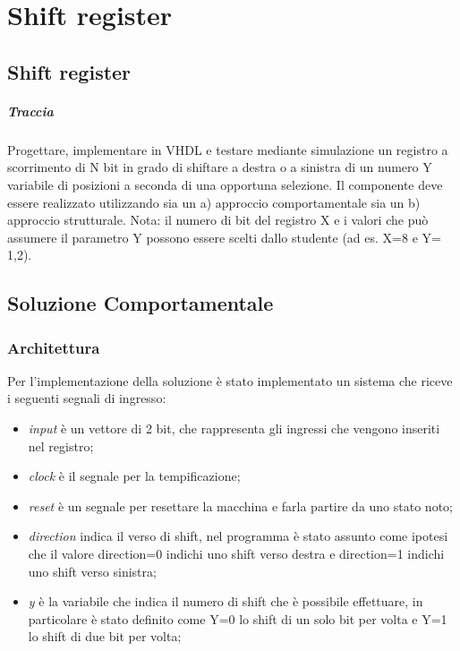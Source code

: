\chapter{Shift register}

\section{Shift register}
\paragraph{Traccia}
Progettare, implementare in VHDL e testare mediante simulazione un registro a scorrimento di N bit in grado di shiftare a destra o a sinistra di un numero Y variabile di posizioni a seconda di una opportuna selezione. Il componente deve essere realizzato utilizzando sia un a) approccio comportamentale sia un b) approccio strutturale.  
Nota: il numero di bit del registro X e i valori che può assumere il parametro Y possono essere scelti dallo studente (ad es. X=8 e Y= {1,2}).

\section{Soluzione Comportamentale}
\subsection{Architettura}
Per l'implementazione della soluzione è stato implementato un sistema che riceve i seguenti segnali di ingresso:
\begin{itemize}
\item \textit{input} è un vettore di 2 bit, che rappresenta gli ingressi che vengono inseriti nel registro;
\item \textit{clock} è il segnale per la tempificazione;
\item \textit{reset} è un segnale per resettare la macchina e farla partire da uno stato noto;
\item \textit{direction} indica il verso di shift, nel programma è stato assunto come ipotesi che il valore direction=0 indichi uno shift verso destra e direction=1 indichi uno shift verso sinistra;
\item \textit{y} è la variabile che indica il numero di shift che è possibile effettuare, in particolare è stato definito come Y=0 lo shift di un solo bit per volta e Y=1 lo shift di due bit per volta;
\end{itemize}

